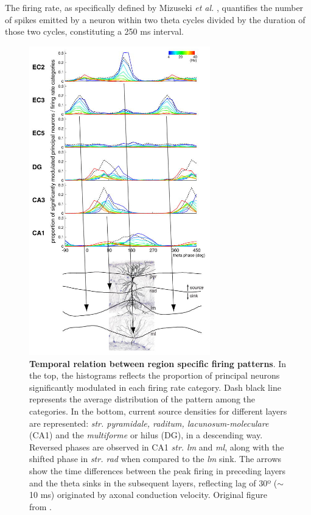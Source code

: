 \documentclass[../main.tex]{subfiles}
\begin{document}
The firing rate, as specifically defined by Mizuseki \textit{et al.} \citep{mizuseki_theta_2009}, quantifies the number of spikes emitted by a neuron within two theta cycles divided by the duration of those two cycles, constituting a 250 ms interval.
\begin{figure}[!htb]
    \centering
    \includegraphics[width=0.70\textwidth]{chapter4/figures/phase-spiking-distributions.jpg}
    \caption{\textbf{Temporal relation between region specific firing patterns}.
    In the top, the histograms reflects the proportion of principal neurons significantly modulated in each firing rate category.
    Dash black line represents the average distribution of the pattern among the categories.
    In the bottom, current source densities for different layers are represented: \textit{str. pyramidale, raditum, lacunosum-moleculare} (CA1) and the \textit{multiforme} or hilus (DG), in a descending way.
    Reversed phases are observed in CA1 \textit{str. lm} and \textit{ml}, along with the shifted phase in \textit{str. rad} when compared to the \textit{lm} sink.
     The arrows show the time differences between the peak firing in preceding layers and the theta sinks in the subsequent layers, reflecting lag of 30º ($\sim$ 10 ms) originated by axonal conduction velocity.
     Original figure from \citep{mizuseki_theta_2009}.}
    \label{fig:phase-spike-distribution}
\end{figure}
\end{document}
